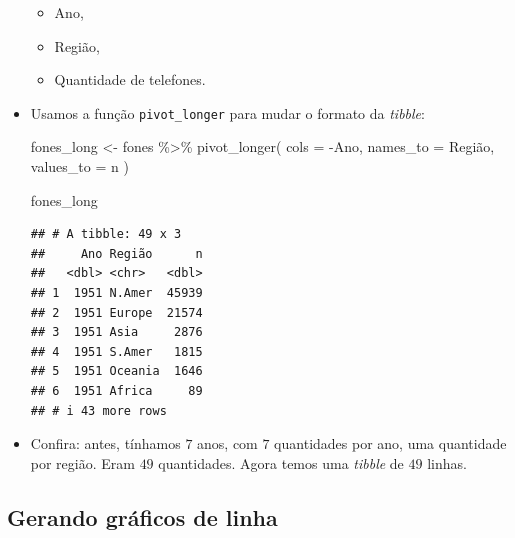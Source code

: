 \documentclass[
  11pt]{report}
\newenvironment{Shaded}{\begin{snugshade}}{\end{snugshade}}
\newcommand{\AttributeTok}[1]{\textcolor[rgb]{0.77,0.63,0.00}{#1}}
\newcommand{\FunctionTok}[1]{\textcolor[rgb]{0.00,0.00,0.00}{#1}}
\newcommand{\NormalTok}[1]{#1}
\newcommand{\OtherTok}[1]{\textcolor[rgb]{0.56,0.35,0.01}{#1}}
\newcommand{\SpecialCharTok}[1]{\textcolor[rgb]{0.00,0.00,0.00}{#1}}
\newcommand{\StringTok}[1]{\textcolor[rgb]{0.31,0.60,0.02}{#1}}
\renewenvironment{Shaded}{
    \begin{mdframed}[%
      roundcorner=2pt,%
      innerleftmargin=5pt,%
      innerrightmargin=5pt,%
      topline=true,%
      leftline=true,%
      rightline=true,%
      bottomline=true,%
      linewidth=0.5pt,%
      linecolor=black!20,%
      backgroundcolor=black!2,%
      skipabove=2ex,%
      skipbelow=2.5ex%
    ]%
  }
  {
    \end{mdframed}
  }
\begin{document}
\begin{itemize}
  \begin{itemize}
  \item
    Ano,
  \item
    Região,
  \item
    Quantidade de telefones.
  \end{itemize}
\item
  Usamos a função \texttt{pivot\_longer} para mudar o formato da \emph{tibble}:

\begin{Shaded}
\begin{Highlighting}[]
\NormalTok{fones\_long }\OtherTok{\textless{}{-}}\NormalTok{ fones }\SpecialCharTok{\%\textgreater{}\%} 
  \FunctionTok{pivot\_longer}\NormalTok{(}
    \AttributeTok{cols =} \SpecialCharTok{{-}}\NormalTok{Ano,}
    \AttributeTok{names\_to =} \StringTok{\textquotesingle{}Região\textquotesingle{}}\NormalTok{,}
    \AttributeTok{values\_to =} \StringTok{\textquotesingle{}n\textquotesingle{}}
\NormalTok{  )}

\NormalTok{fones\_long}
\end{Highlighting}
\end{Shaded}

\begin{verbatim}
## # A tibble: 49 x 3
##     Ano Região      n
##   <dbl> <chr>   <dbl>
## 1  1951 N.Amer  45939
## 2  1951 Europe  21574
## 3  1951 Asia     2876
## 4  1951 S.Amer   1815
## 5  1951 Oceania  1646
## 6  1951 Africa     89
## # i 43 more rows
\end{verbatim}
\item
  Confira: antes, tínhamos $7$ anos, com $7$ quantidades por ano, uma quantidade por região. Eram $49$ quantidades. Agora temos uma \emph{tibble} de $49$ linhas.
\end{itemize}

\hypertarget{gerando-gruxe1ficos-de-linha}{%
\subsection{Gerando gráficos de linha}\label{gerando-gruxe1ficos-de-linha}}
\end{document}
